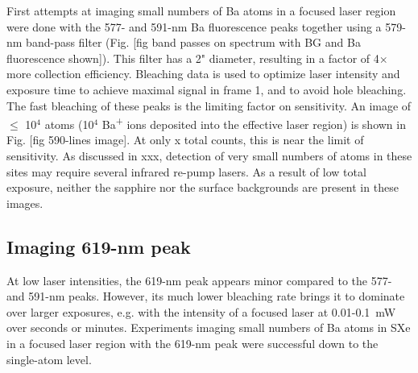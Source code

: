 First attempts at imaging small numbers of Ba atoms in a focused laser region were done with the 577- and 591-nm Ba fluorescence peaks together using a {\color{red}579-nm} band-pass filter (Fig. [fig band passes on spectrum with BG and Ba fluorescence shown]).  This filter has a 2" diameter, resulting in a factor of 4$\times$ more collection efficiency.  Bleaching data is used to optimize laser intensity and exposure time to achieve maximal signal in frame 1, and to avoid hole bleaching.  The fast bleaching of these peaks is the limiting factor on sensitivity.  An image of $\leq$ 10$^{4}$ atoms (10$^{4}$ Ba\textsuperscript{+} ions deposited into the effective laser region) is shown in Fig. [fig 590-lines image].  At only x total counts, this is near the limit of sensitivity.  As discussed in xxx, detection of very small numbers of atoms in these sites may require several infrared re-pump lasers.  As a result of low total exposure, neither the sapphire nor the surface backgrounds are present in these images.

\subsection{Imaging 619-nm peak}

At low laser intensities, the 619-nm peak appears minor compared to the 577- and 591-nm peaks.  However, its much lower bleaching rate brings it to dominate over larger exposures, e.g. with the intensity of a focused laser at 0.01-0.1~mW over seconds or minutes.  Experiments imaging small numbers of Ba atoms in SXe in a focused laser region with the 619-nm peak were successful down to the single-atom level.

